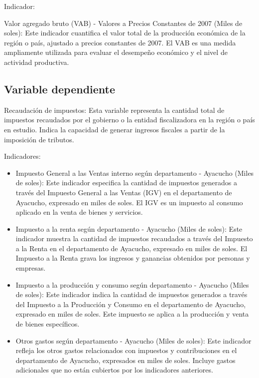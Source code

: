 \documentclass[
  jou,
  floatsintext,
  longtable,
  a4paper,
  nolmodern,
  notxfonts,
  notimes,
  12pt,
  colorlinks=true,linkcolor=blue,citecolor=blue,urlcolor=blue]{apa7}
\begin{document}
Indicador:

Valor agregado bruto (VAB) - Valores a Precios Constantes de 2007 (Miles
de soles): Este indicador cuantifica el valor total de la producción
económica de la región o país, ajustado a precios constantes de 2007. El
VAB es una medida ampliamente utilizada para evaluar el desempeño
económico y el nivel de actividad productiva.

\subsection{Variable dependiente}\label{sec-variable-dependiente}

Recaudación de impuestos: Esta variable representa la cantidad total de
impuestos recaudados por el gobierno o la entidad fiscalizadora en la
región o país en estudio. Indica la capacidad de generar ingresos
fiscales a partir de la imposición de tributos.

Indicadores:

\begin{itemize}
\item
  Impuesto General a las Ventas interno según departamento - Ayacucho
  (Miles de soles): Este indicador especifica la cantidad de impuestos
  generados a través del Impuesto General a las Ventas (IGV) en el
  departamento de Ayacucho, expresado en miles de soles. El IGV es un
  impuesto al consumo aplicado en la venta de bienes y servicios.
\item
  Impuesto a la renta según departamento - Ayacucho (Miles de soles):
  Este indicador muestra la cantidad de impuestos recaudados a través
  del Impuesto a la Renta en el departamento de Ayacucho, expresado en
  miles de soles. El Impuesto a la Renta grava los ingresos y ganancias
  obtenidos por personas y empresas.
\item
  Impuesto a la producción y consumo según departamento - Ayacucho
  (Miles de soles): Este indicador indica la cantidad de impuestos
  generados a través del Impuesto a la Producción y Consumo en el
  departamento de Ayacucho, expresado en miles de soles. Este impuesto
  se aplica a la producción y venta de bienes específicos.
\item
  Otros gastos según departamento - Ayacucho (Miles de soles): Este
  indicador refleja los otros gastos relacionados con impuestos y
  contribuciones en el departamento de Ayacucho, expresados en miles de
  soles. Incluye gastos adicionales que no están cubiertos por los
  indicadores anteriores.
\end{itemize}
\end{document}
